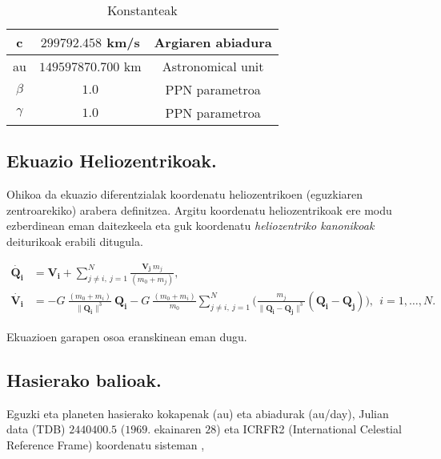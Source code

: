 \begin{table}[h]
\caption{Konstanteak}
\label{tab:1}       %
\centering
\begin{tabular}{ c c c }
\hline
  c             &  $299792.458$ km/s           & Argiaren abiadura  \\
\hline
  au            &  $149597870.700$ km           & Astronomical unit  \\
\hline 	       
$\beta$          & $1.0$                       & PPN parametroa     \\
\hline 
$\gamma$         & $1.0$                       & PPN parametroa     \\
\hline
\end{tabular}
\end{table}


\subsection{Ekuazio Heliozentrikoak.}

Ohikoa da ekuazio diferentzialak koordenatu heliozentrikoen (eguzkiaren zentroarekiko) arabera definitzea. Argitu koordenatu heliozentrikoak ere modu ezberdinean eman daitezkeela eta guk koordenatu \emph{heliozentriko kanonikoak} deiturikoak erabili ditugula.

\begin{align*}
\dot{\mathbf{Q_i}} &=\mathbf{V_i}+ \sum\limits_{j\ne i,\ j=1}^{N} \frac{\mathbf{V_j} \ m_j}{(m_0+m_j)},\\
\dot{\mathbf{V_i}} &=- G  \ \frac{(m_0+m_i)}{\|\mathbf{Q_i}\|^3 }\ \mathbf{Q_i}-G \ \frac{(m_0+m_i)}{m_0}
                    \sum\limits_{j \ne i , \ j=1}^{N} \bigg( \frac{m_j}{\|\mathbf{Q_i}-\mathbf{Q_j}\|^3} (\mathbf{Q_i-\mathbf{Q_j}})     \bigg), \ \ i=1,\dots, N.
\end{align*}

Ekuazioen garapen osoa eranskinean eman dugu.

\subsection{Hasierako balioak.}

Eguzki eta planeten hasierako kokapenak (au) eta abiadurak (au/day), Julian data (TDB) $2440400.5$ ($1969$. ekainaren $28$) eta ICRFR2 (International Celestial Reference Frame) koordenatu sisteman \cite{Folkner2014},

